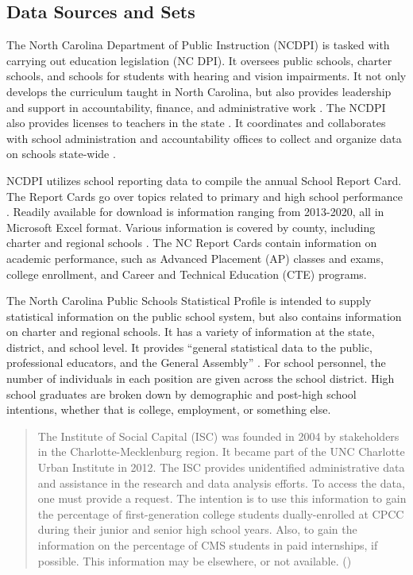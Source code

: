 \subsection{Data Sources and Sets}
The North Carolina Department of Public Instruction (NCDPI) is tasked with carrying out education legislation (NC DPI). It oversees public schools, charter schools, and schools for students with hearing and vision impairments. 
It not only develops the curriculum taught in North Carolina, but also provides leadership and support in accountability, finance, and administrative work \parencite[][]{NCDPI}.
The NCDPI also provides licenses to teachers in the state \parencite[][]{NCDPI}. It coordinates and collaborates with school administration and accountability offices to collect and organize data on schools state-wide \parencite[][]{NCDPI}.

NCDPI utilizes school reporting data to compile the annual School Report Card. The Report Cards go over topics related to primary and high school performance \parencite[][]{NCReportCards}.
Readily available for download is information ranging from 2013-2020, all in Microsoft Excel format. Various information is covered by county, including charter and regional schools \parencite[][]{NCReportCards}. 
The NC Report Cards contain information on academic performance, such as Advanced Placement (AP) classes and exams, college enrollment, and Career and Technical Education (CTE) programs\parencite[][]{NCReportCards}.

The North Carolina Public Schools Statistical Profile is intended to supply statistical information on the public school system, but also contains information on charter and regional schools\parencite[][]{NCStats}. 
It has a variety of information at the state, district, and school level\parencite[][]{NCStats}.
It provides “general statistical data to the public, professional educators, and the General Assembly” \parencite[][]{NCStats}. 
For school personnel, the number of individuals in each position are given across the school district. High school graduates are broken down by demographic and post-high school intentions, whether that is college, employment, or something else\parencite[][]{NCStats}.

\blockquote{The Institute of Social Capital (ISC) was founded in 2004 by stakeholders in the Charlotte-Mecklenburg region. It became part of the UNC Charlotte Urban Institute in 2012. 
The ISC provides unidentified administrative data and assistance in the research and data analysis efforts. To access the data, one must provide a request. 
The intention is to use this information to gain the percentage of first-generation college students dually-enrolled at CPCC during their junior and senior high school years. 
Also, to gain the information on the percentage of CMS students in paid internships, if possible. This information may be elsewhere, or not available. (\cite{team1a})}

